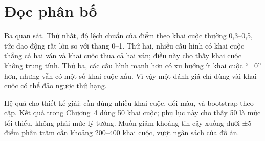 \section{Đọc phân bố}

Ba quan sát. Thứ nhất, độ lệch chuẩn của điểm theo khai cuộc thường 0,3--0,5, tức dao động rất lớn so với thang 0--1. Thứ hai, nhiều cấu hình có khai cuộc thắng cả hai ván và khai cuộc thua cả hai ván; điều này cho thấy khai cuộc không trung tính. Thứ ba, các cấu hình mạnh hơn có xu hướng ít khai cuộc ``=0'' hơn, nhưng vẫn có một số khai cuộc xấu. Vì vậy một đánh giá chỉ dùng vài khai cuộc có thể đảo ngược thứ hạng.

Hệ quả cho thiết kế giải: cần dùng nhiều khai cuộc, đổi màu, và bootstrap theo cặp. Kết quả trong Chương~4 dùng 50 khai cuộc; phụ lục này cho thấy 50 là mức tối thiểu, không phải mức lý tưởng. Muốn giảm khoảng tin cậy xuống dưới ±5 điểm phần trăm cần khoảng 200--400 khai cuộc, vượt ngân sách của đồ án.